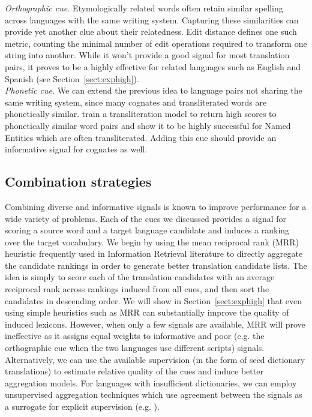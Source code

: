 \documentclass{article}
\newcommand{\secref}[1]{Section~\ref{#1}}
\begin{document}
\noindent\emph{Orthographic cue.} Etymologically related words often retain similar spelling across languages with the same writing system.  Capturing these similarities can provide yet another clue about their relatedness.  Edit distance defines one such metric, counting the minimal number of edit operations required to transform one string into another.  While it won't provide a good signal for most translation pairs, it proves to be a highly effective for related languages such as English and Spanish (see \secref{sect:exphigh}). \\

\noindent\emph{Phonetic cue.}  We can extend the previous idea to language pairs not sharing the same writing system, since many cognates and transliterated words are phonetically similar.  \cite{Klementiev:2006b} train a transliteration model to return high scores to phonetically similar word pairs and show it to be highly successful for Named Entities which are often transliterated.  Adding this cue should provide an informative signal for cognates as well. \\


\subsection{Combination strategies}

Combining diverse and informative signals is known to improve performance \cite{Dietterich:2000} for a wide variety of problems.  Each of the cues we discussed provides a signal for scoring a source word and a target language candidate and induces a ranking over the target vocabulary.  We begin by using the mean reciprocal rank (MRR) heuristic frequently used in Information Retrieval literature to directly aggregate the candidate rankings in order to generate better translation candidate lists.  The idea is simply to score each of the translation candidates with an average reciprocal rank across rankings induced from all cues, and then sort the candidates in descending order. We will show in \secref{sect:exphigh} that even using simple heuristics such as MRR can substantially improve the quality of induced lexicons.  However, when only a few signals are available, MRR will prove ineffective as it assigns equal weights to informative and poor (e.g. the orthographic cue when the two languages use different scripts) signals.  Alternatively, we can use the available supervision (in the form of seed dictionary translations) to estimate relative quality of the cues and induce better aggregation models. For languages with insufficient dictionaries, we can employ unsupervised aggregation techniques which use agreement between the signals as a surrogate for explicit supervision (e.g. \cite{Klementiev:2006b, Klementiev:2008a}).\\
\end{document}
